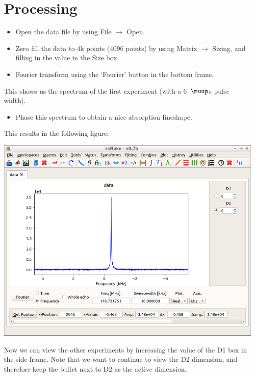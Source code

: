 \documentclass[11pt,a4paper]{article}
\begin{document}
\section{Processing}
\begin{itemize}
\item Open the data file by using File $\longrightarrow$ Open.
\item Zero fill the data to 4k points (4096 points) by using Matrix $\longrightarrow$ Sizing, and filling in the value in the Size box.
\item Fourier transform using the `Fourier' button in the bottom frame.
\end{itemize}
This shows us the spectrum of the first experiment (with a 6~$\muup$s pulse width).
\begin{itemize}
\item Phase this spectrum to obtain a nice absorption lineshape.
\end{itemize}
This results in the following figure:

\begin{center}
\includegraphics[width=0.8\linewidth]{Figs/Fig1.png}
\end{center}


Now we can view the other experiments by increasing the value of the D1 box in the side frame.
Note that we want to continue to view the D2 dimension, and therefore keep the bullet next to D2 as the active dimension.
\end{document}
